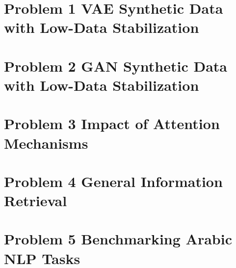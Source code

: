 \documentclass[12pt,a4paper]{article}
\begin{document}
\section{Problem 1 VAE Synthetic Data with Low-Data Stabilization}

\newpage

\section{Problem 2 GAN Synthetic Data with Low-Data Stabilization}

\newpage

\section{Problem 3  Impact of Attention Mechanisms}

\newpage

\section{Problem 4 General Information Retrieval}

\newpage

\section{Problem 5 Benchmarking Arabic NLP Tasks}

\newpage
\end{document}
